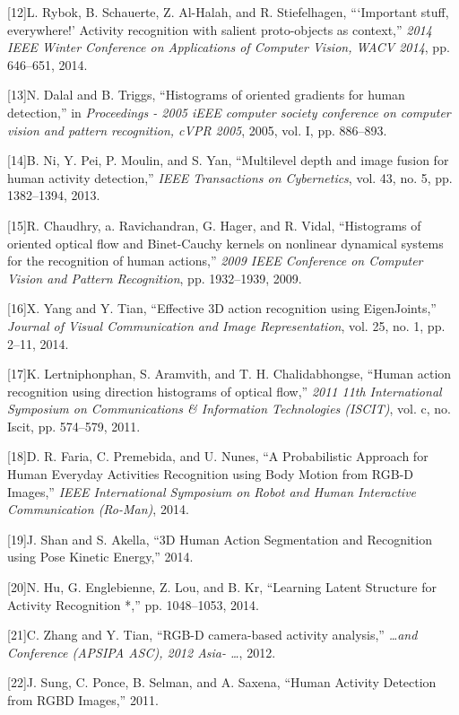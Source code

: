 {[}12{]}L. Rybok, B. Schauerte, Z. Al-Halah, and R. Stiefelhagen,
```Important stuff, everywhere!' Activity recognition with salient
proto-objects as context,'' \emph{2014 IEEE Winter Conference on
Applications of Computer Vision, WACV 2014}, pp. 646--651, 2014.

{[}13{]}N. Dalal and B. Triggs, ``Histograms of oriented gradients for
human detection,'' in \emph{Proceedings - 2005 iEEE computer society
conference on computer vision and pattern recognition, cVPR 2005}, 2005,
vol. I, pp. 886--893.

{[}14{]}B. Ni, Y. Pei, P. Moulin, and S. Yan, ``Multilevel depth and
image fusion for human activity detection,'' \emph{IEEE Transactions on
Cybernetics}, vol. 43, no. 5, pp. 1382--1394, 2013.

{[}15{]}R. Chaudhry, a. Ravichandran, G. Hager, and R. Vidal,
``Histograms of oriented optical flow and Binet-Cauchy kernels on
nonlinear dynamical systems for the recognition of human actions,''
\emph{2009 IEEE Conference on Computer Vision and Pattern Recognition},
pp. 1932--1939, 2009.

{[}16{]}X. Yang and Y. Tian, ``Effective 3D action recognition using
EigenJoints,'' \emph{Journal of Visual Communication and Image
Representation}, vol. 25, no. 1, pp. 2--11, 2014.

{[}17{]}K. Lertniphonphan, S. Aramvith, and T. H. Chalidabhongse,
``Human action recognition using direction histograms of optical flow,''
\emph{2011 11th International Symposium on Communications \& Information
Technologies (ISCIT)}, vol. c, no. Iscit, pp. 574--579, 2011.

{[}18{]}D. R. Faria, C. Premebida, and U. Nunes, ``A Probabilistic
Approach for Human Everyday Activities Recognition using Body Motion
from RGB-D Images,'' \emph{IEEE International Symposium on Robot and
Human Interactive Communication (Ro-Man)}, 2014.

{[}19{]}J. Shan and S. Akella, ``3D Human Action Segmentation and
Recognition using Pose Kinetic Energy,'' 2014.

{[}20{]}N. Hu, G. Englebienne, Z. Lou, and B. Kr, ``Learning Latent
Structure for Activity Recognition *,'' pp. 1048--1053, 2014.

{[}21{]}C. Zhang and Y. Tian, ``RGB-D camera-based activity analysis,''
\emph{\ldots{}and Conference (APSIPA ASC), 2012 Asia- \ldots{}}, 2012.

{[}22{]}J. Sung, C. Ponce, B. Selman, and A. Saxena, ``Human Activity
Detection from RGBD Images,'' 2011.

